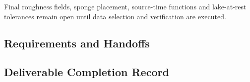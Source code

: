 Final roughness fields, sponge placement, source-time functions and
lake-at-rest tolerances remain open until data selection and
verification are executed.

\subsection{Requirements and Handoffs}
\label{sec:res-num-src-requirements}


\subsection{Deliverable Completion Record}
\label{sec:res-num-src-completion-record}

%
%
%
